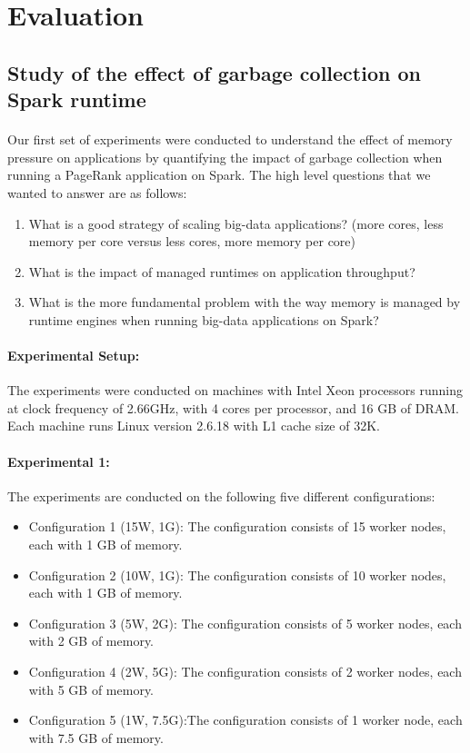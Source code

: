 \section{Evaluation}
\label{sec:eval}

\subsection{Study of the effect of garbage collection on Spark runtime}
\paragraph{}
Our first set of experiments were conducted to understand the effect of
memory pressure on applications by quantifying the impact of garbage
collection when running a PageRank application on Spark. The high level
questions that we wanted to answer are as follows:

\begin{enumerate}
\item What is a good strategy of scaling big-data applications? (more
    cores, less memory per core versus less cores, more memory per core) 
\item What is the impact of managed runtimes on application throughput?
\item What is the more fundamental problem with the way memory is managed
    by runtime engines when running big-data applications on Spark?
\end{enumerate}

\paragraph{Experimental Setup:}
The experiments were conducted on machines with Intel Xeon processors
running at clock frequency of 2.66GHz, with 4 cores per processor, and
16 GB of DRAM. Each machine runs Linux version 2.6.18 with L1 cache
size of 32K.

\paragraph{Experimental 1:}
The experiments are conducted on the following five different configurations:
\begin{itemize}
\item Configuration 1 (15W, 1G): The configuration consists of 15 worker nodes, each with 1 GB of memory.
\item Configuration 2 (10W, 1G): The configuration consists of 10 worker nodes, each with 1 GB of memory.
\item Configuration 3 (5W, 2G):  The configuration consists of 5 worker nodes, each with 2 GB of memory.
\item Configuration 4 (2W, 5G):  The configuration consists of 2 worker nodes, each with 5 GB of memory.
\item Configuration 5 (1W, 7.5G):The configuration consists of 1 worker node, each with 7.5 GB of memory.
\end{itemize}

